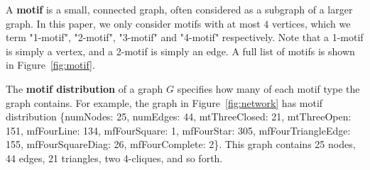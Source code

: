 A \textbf{motif} is a small, connected graph, often considered as a
subgraph of a larger graph. In this paper, we only
consider motifs with at most $4$ vertices, which we term "1-motif", "2-motif", "3-motif" and
"4-motif" respectively. Note that a 1-motif is simply a vertex, and a 2-motif is simply an edge. A full list of motifs is shown in
Figure~\ref{fig:motif}.

The \textbf{motif distribution} of a graph $G$ specifies how many of each
motif type the graph contains.  For example, the graph in Figure~\ref{fig:network} has motif
distribution \{numNodes: 25, numEdges: 44, mtThreeClosed: 21, mtThreeOpen: 151, mfFourLine: 134,
mfFourSquare: 1, mfFourStar: 305, mfFourTriangleEdge: 155, mfFourSquareDiag:
26, mfFourComplete: 2\}.  This graph contains 25 nodes, 44 edges, 21 triangles, two 4-cliques, and
so forth.
